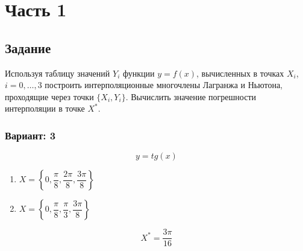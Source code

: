 
\chapter*{Часть 1}

\section*{Задание}
Используя таблицу значений $Y_i$ функции $y=f(x)$,
вычисленных в
точках $X_i$, $i=0,\dots,3$ построить интерполяционные
многочлены Лагранжа
и Ньютона, проходящие через точки $\{X_i, Y_i\}$.
Вычислить значение
погрешности интерполяции в точке $X^*$.

\subsection*{Вариант: 3}

\begin{equation*}y = tg(x)
\end{equation*}

\begin{enumerate} 
    \item $X=\left\{0, 
        \dfrac{\pi}{8}, \dfrac{2\pi}{8},
        \dfrac{3\pi}{8}\right\}$

    \item $X=\left\{0,
        \dfrac{\pi}{8}, \dfrac{\pi}{3},
        \dfrac{3\pi}{8}\right\}$
\end{enumerate}

\begin{equation*}X^* = \frac{3\pi}{16}\end{equation*}
\pagebreak